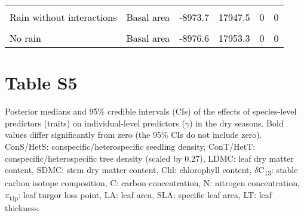 \documentclass[
  12pt,
  letterpaper,
  DIV=11,
  numbers=noendperiod]{scrartcl}
\begin{document}
\begin{table}[H]
{\begin{tabular}[t]{llllll}
\cellcolor{gray!6}{\textcolor{black}{Rain with an interaction of cons}} & \cellcolor{gray!6}{\textcolor{black}{Abundance}} & \cellcolor{gray!6}{\textcolor{black}{-8973.5}} & \cellcolor{gray!6}{\textcolor{black}{17947.0}} & \cellcolor{gray!6}{\textcolor{black}{0}} & \cellcolor{gray!6}{\textcolor{black}{0}}\\
\textcolor{black}{Rain without interactions} & \textcolor{black}{Basal area} & \textcolor{black}{-8973.7} & \textcolor{black}{17947.5} & \textcolor{black}{0} & \textcolor{black}{0}\\
\addlinespace
\cellcolor{gray!6}{\textcolor{black}{No rain}} & \cellcolor{gray!6}{\textcolor{black}{Abundance}} & \cellcolor{gray!6}{\textcolor{black}{-8975.2}} & \cellcolor{gray!6}{\textcolor{black}{17950.3}} & \cellcolor{gray!6}{\textcolor{black}{0}} & \cellcolor{gray!6}{\textcolor{black}{0}}\\
\textcolor{black}{No rain} & \textcolor{black}{Basal area} & \textcolor{black}{-8976.6} & \textcolor{black}{17953.3} & \textcolor{black}{0} & \textcolor{black}{0}\\
\bottomrule
\end{tabular}}
\end{table}

\newpage

\hypertarget{table-s5}{%
\section{Table S5}\label{table-s5}}

Posterior medians and 95\% credible intervals (CIs) of the effects of
species-level predictors (traits) on individual-level predictors
(\(\gamma\)) in the dry seasons. Bold values differ significantly from
zero (the 95\% CIs do not include zero). ConS/HetS:
conspecific/heterospecific seedling density, ConT/HetT:
conspecific/heterospecific tree density (scaled by 0.27), LDMC: leaf dry
matter content, SDMC: stem dry matter content, Chl: chlorophyll content,
\(\delta\)C\textsubscript{13}: stable carbon isotope composition, C:
carbon concentration, N: nitrogen concentration,
\(\pi\)\textsubscript{tlp}: leaf turgor loss point, LA: leaf area, SLA:
specific leaf area, LT: leaf thickness.
\end{document}
